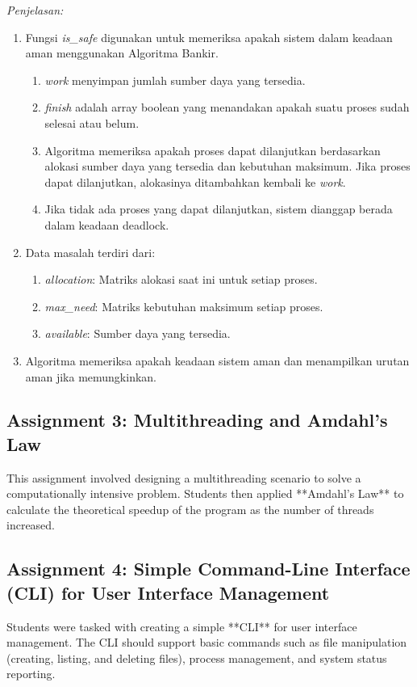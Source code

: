 \documentclass[12pt]{article}
\begin{document}
\begin{enumerate}
\textit{Penjelasan:}
\begin{enumerate}
    \item Fungsi \textit{is\_safe} digunakan untuk memeriksa apakah sistem dalam keadaan aman menggunakan Algoritma Bankir.
        \begin{enumerate}
            \item \textit{work} menyimpan jumlah sumber daya yang tersedia.
            \item \textit{finish} adalah array boolean yang menandakan apakah suatu proses sudah selesai atau belum.
            \item Algoritma memeriksa apakah proses dapat dilanjutkan berdasarkan alokasi sumber daya yang tersedia dan kebutuhan maksimum. Jika proses dapat dilanjutkan, alokasinya ditambahkan kembali ke \textit{work}.
            \item Jika tidak ada proses yang dapat dilanjutkan, sistem dianggap berada dalam keadaan deadlock.
        \end{enumerate}
    \item Data masalah terdiri dari:
        \begin{enumerate}
            \item \textit{allocation}: Matriks alokasi saat ini untuk setiap proses.
            \item \textit{max\_need}: Matriks kebutuhan maksimum setiap proses.
            \item \textit{available}: Sumber daya yang tersedia.
        \end{enumerate}
    \item Algoritma memeriksa apakah keadaan sistem aman dan menampilkan urutan aman jika memungkinkan.
\end{enumerate}
\end{enumerate}

\subsection{Assignment 3: Multithreading and Amdahl's Law}
This assignment involved designing a multithreading scenario to solve a computationally intensive problem. Students then applied **Amdahl's Law** to calculate the theoretical speedup of the program as the number of threads increased.

\subsection{Assignment 4: Simple Command-Line Interface (CLI) for User Interface Management}
Students were tasked with creating a simple **CLI** for user interface management. The CLI should support basic commands such as file manipulation (creating, listing, and deleting files), process management, and system status reporting.
\end{document}
